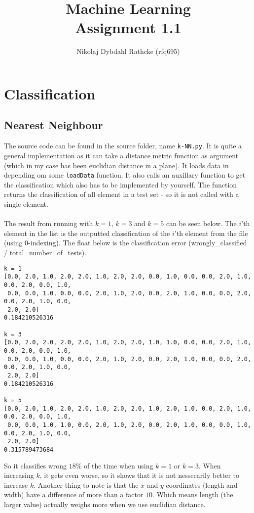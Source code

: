 \documentclass[a4paper]{article}
\author{Nikolaj Dybdahl Rathcke (rfq695)}
\title{Machine Learning \\ Assignment 1.1}
\begin{document}
\maketitle

\section{Classification}
\subsection{Nearest Neighbour}
The source code can be found in the source folder, name \texttt{k-NN.py}. It is quite a general implementation as it can take a distance metric function as argument (which in my case has been euclidian distance in a plane). It loads data in depending om some \texttt{loadData} function. It also calls an auxillary function to get the classification which also has to be implemented by yourself. The function returns the classification of all element in a test set - so it is not called with a single element. \\
\\
The result from running with $k=1$, $k=3$ and $k=5$ can be seen below. The $i$'th element in the list is the outputted classification of the $i$'th element from the file (using $0$-indexing). The float below is the classification error (wrongly\_classified / total\_number\_of\_tests).
\begin{verbatim}
k = 1
[0.0, 2.0, 1.0, 2.0, 2.0, 1.0, 2.0, 2.0, 0.0, 1.0, 0.0, 0.0, 2.0, 1.0, 0.0, 2.0, 0.0, 1.0,
 0.0, 0.0, 1.0, 0.0, 0.0, 2.0, 1.0, 2.0, 0.0, 2.0, 1.0, 0.0, 0.0, 2.0, 0.0, 2.0, 1.0, 0.0,
 2.0, 2.0]
0.184210526316

k = 3
[0.0, 2.0, 2.0, 2.0, 2.0, 1.0, 2.0, 2.0, 1.0, 1.0, 0.0, 0.0, 2.0, 1.0, 0.0, 2.0, 0.0, 1.0,
 0.0, 0.0, 1.0, 0.0, 0.0, 2.0, 1.0, 2.0, 0.0, 2.0, 1.0, 0.0, 0.0, 2.0, 0.0, 2.0, 1.0, 0.0,
 2.0, 2.0]
0.184210526316

k = 5
[0.0, 2.0, 1.0, 2.0, 2.0, 1.0, 2.0, 2.0, 1.0, 2.0, 1.0, 0.0, 2.0, 1.0, 0.0, 2.0, 0.0, 1.0,
 0.0, 0.0, 1.0, 1.0, 0.0, 2.0, 1.0, 2.0, 0.0, 2.0, 1.0, 0.0, 0.0, 1.0, 0.0, 2.0, 1.0, 0.0,
 2.0, 2.0]
0.315789473684
\end{verbatim}
So it classifies wrong $18\%$ of the time when using $k=1$ or $k=3$. When increasing $k$, it gets even worse, so it shows that it is not nessecarily better to increase $k$. Another thing to note is that the $x$ and $y$ coordinates (length and width) have a difference of more than a factor $10$. Which means length (the larger value) actually weighs more when we use euclidian distance.
\end{document}
